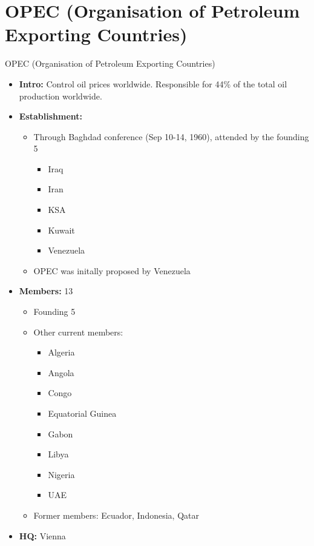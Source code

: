 \documentclass[
  12pt,
  ignorenonframetext,
  progressbar=frametitle]{beamer}
\providecommand{\tightlist}{%
  \setlength{\itemsep}{0pt}\setlength{\parskip}{0pt}}
\begin{document}
\section{OPEC (Organisation of Petroleum Exporting Countries)}
\begin{frame}[allowframebreaks]
{OPEC (Organisation of Petroleum Exporting Countries)}
\protect\hypertarget{opec-organisation-of-petroleum-exporting-countries}{}
\begin{itemize}
\tightlist
\item
  \textbf{Intro:} Control oil prices worldwide. Responsible for 44\% of
  the total oil production worldwide.
\item
  \textbf{Establishment:}

  \begin{itemize}
  \tightlist
  \item
    Through Baghdad conference (Sep 10-14, 1960), attended by the
    founding 5

    \begin{itemize}
    \tightlist
    \item
      Iraq
    \item
      Iran
    \item
      KSA
    \item
      Kuwait
    \item
      Venezuela
    \end{itemize}
  \item
    OPEC was initally proposed by Venezuela
  \end{itemize}
\item
  \textbf{Members:} 13

  \begin{itemize}
  \tightlist
  \item
    Founding 5
  \item
    Other current members:

    \begin{itemize}
    \tightlist
    \item
      Algeria
    \item
      Angola
    \item
      Congo
    \item
      Equatorial Guinea
    \item
      Gabon
    \item
      Libya
    \item
      Nigeria
    \item
      UAE
    \end{itemize}
  \item
    Former members: Ecuador, Indonesia, Qatar
  \end{itemize}
\item
  \textbf{HQ:} Vienna
\end{itemize}
\end{frame}
\end{document}

